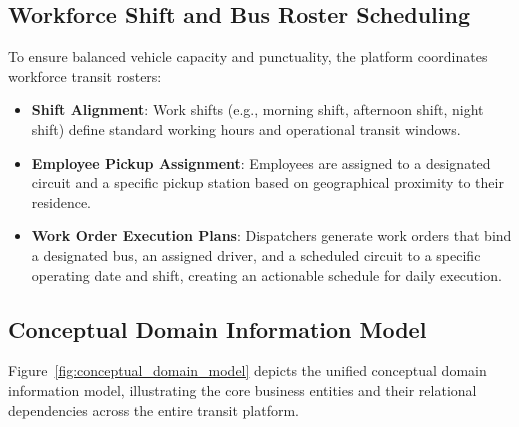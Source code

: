 \subsection{Workforce Shift and Bus Roster Scheduling}
To ensure balanced vehicle capacity and punctuality, the platform coordinates workforce transit rosters:
\begin{itemize}
  \item \textbf{Shift Alignment}: Work shifts (e.g., morning shift, afternoon shift, night shift) define standard working hours and operational transit windows.
  \item \textbf{Employee Pickup Assignment}: Employees are assigned to a designated circuit and a specific pickup station based on geographical proximity to their residence.
  \item \textbf{Work Order Execution Plans}: Dispatchers generate work orders that bind a designated bus, an assigned driver, and a scheduled circuit to a specific operating date and shift, creating an actionable schedule for daily execution.
\end{itemize}

\subsection{Conceptual Domain Information Model}
Figure~\ref{fig:conceptual_domain_model} depicts the unified conceptual domain information model, illustrating the core business entities and their relational dependencies across the entire transit platform.


